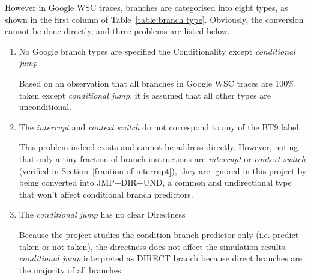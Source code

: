 \hspace*{\fill}\par
However in Google WSC traces, branches are categorised into eight types, as shown in the first column of Table~\ref{table:branch type}. Obviously, the conversion cannot be done directly, and three problems are listed below.

\begin{enumerate}[itemsep= 0pt,topsep = 0pt, partopsep=4 pt, leftmargin= 32 pt]
\item No Google branch types are specified the Conditionality except \textit{conditional jump}

Based on an observation that all branches in Google WSC traces are 100\% taken except \textit{conditional jump}, it is assumed that all other types are unconditional.


\item The \textit{interrupt} and \textit{context switch} do not correspond to any of the BT9 label. \label{interrupt}

This problem indeed exists and cannot be address directly. However, noting that only a tiny fraction of branch instructions are \textit{interrupt} or \textit{context switch} (verified in Section~\ref{frantion of interrupt}), they are ignored in this project by being converted into JMP+DIR+UND, a common and undirectional type that won't affect conditional branch predictors. 

\item The \textit{conditional jump} has no clear Directness

Because the project studies the condition branch predictor only (i.e. predict taken or not-taken), the directness does not affect the simulation results. \textit{conditional jump} interpreted as DIRECT branch because direct branches are the majority of all branches.

\end{enumerate}



